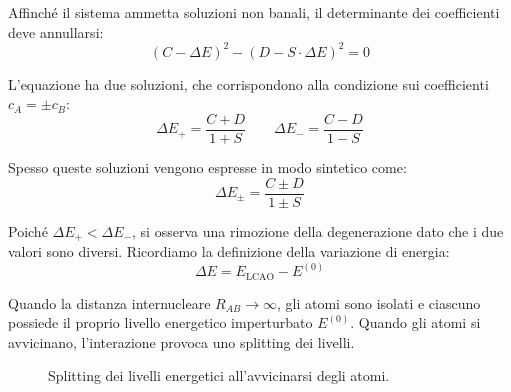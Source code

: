 Affinché il sistema ammetta soluzioni non banali, il determinante dei coefficienti deve annullarsi:
\begin{equation}
    (C - \Delta E)^2 - (D - S \cdot \Delta E)^2 = 0
\end{equation}

L'equazione ha due soluzioni, che corrispondono alla condizione sui coefficienti \( c_A = \pm c_B \):
\begin{equation}
    \Delta E_+ = \frac{C + D}{1 + S} \qquad \Delta E_- = \frac{C - D}{1 - S}
\end{equation}

Spesso queste soluzioni vengono espresse in modo sintetico come:
\begin{equation}
    \Delta E_{\pm} = \frac{C \pm D}{1 \pm S}
\end{equation}

Poiché \( \Delta E_+ < \Delta E_- \), si osserva una rimozione della degenerazione dato che i due valori sono diversi.
Ricordiamo la definizione della variazione di energia:
\begin{equation}
    \Delta E = E_{\text{LCAO}} - E^{(0)}
\end{equation}

Quando la distanza internucleare \( R_{AB} \to \infty \), gli atomi sono isolati e ciascuno possiede il proprio livello energetico imperturbato \( E^{(0)} \). Quando gli atomi si avvicinano, l'interazione provoca uno splitting dei livelli.

\begin{figure}[htbp]
    \centering
    \caption{Splitting dei livelli energetici all'avvicinarsi degli atomi.}
    \label{fig:splitting_lcao}
\end{figure}

